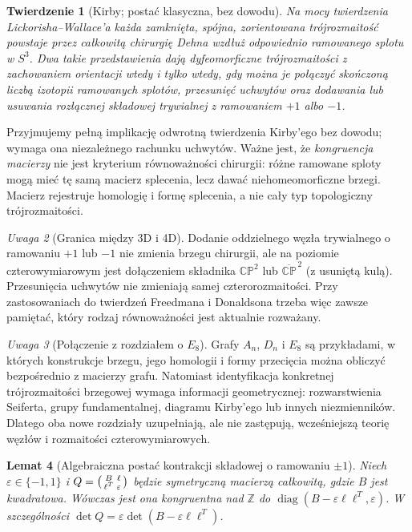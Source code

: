 \documentclass[11pt,a4paper]{report}
\numberwithin{equation}{section}
\theoremstyle{plain}
\newtheorem{twierdzenie}{Twierdzenie}[section]
\newtheorem{lemat}[twierdzenie]{Lemat}
\theoremstyle{definition}
\theoremstyle{remark}
\newtheorem{uwaga}[twierdzenie]{Uwaga}
\begin{document}
\begin{twierdzenie}[Kirby; postać klasyczna, bez dowodu]
Na mocy twierdzenia Lickorisha--Wallace'a każda zamknięta,
spójna, zorientowana trójrozmaitość powstaje przez
całkowitą chirurgię Dehna wzdłuż odpowiednio
ramowanego splotu w $S^3$.
Dwa takie przedstawienia dają dyfeomorficzne
trójrozmaitości z zachowaniem orientacji wtedy i tylko wtedy,
gdy można je połączyć skończoną liczbą izotopii
ramowanych splotów, przesunięć uchwytów oraz
dodawania lub usuwania \emph{rozłącznej} składowej
trywialnej z ramowaniem $+1$ albo $-1$.
\end{twierdzenie}

Przyjmujemy pełną implikację odwrotną twierdzenia
Kirby'ego bez dowodu; wymaga ona niezależnego
rachunku uchwytów. Ważne jest, że \emph{kongruencja
macierzy} nie jest kryterium równoważności chirurgii:
różne ramowane sploty mogą mieć tę samą macierz
splecenia, lecz dawać niehomeomorficzne brzegi.
Macierz rejestruje homologię i formę splecenia,
a nie cały typ topologiczny trójrozmaitości.

\begin{uwaga}[Granica między 3D i 4D]
Dodanie oddzielnego węzła trywialnego o ramowaniu
$+1$ lub $-1$ nie zmienia brzegu chirurgii,
ale na poziomie czterowymiarowym jest dołączeniem
składnika $\mathbb{CP}^2$ lub
$\overline{\mathbb{CP}}^{\,2}$ (z usuniętą kulą).
Przesunięcia uchwytów nie zmieniają samej
czterorozmaitości. Przy zastosowaniach do twierdzeń
Freedmana i Donaldsona trzeba więc zawsze pamiętać,
który rodzaj równoważności jest aktualnie rozważany.
\end{uwaga}

\begin{uwaga}[Połączenie z rozdziałem o $E_8$]
Grafy $A_n$, $D_n$ i $E_8$ są przykładami, w których
konstrukcje brzegu, jego homologii i formy przecięcia
można obliczyć bezpośrednio z macierzy grafu. Natomiast
identyfikacja konkretnej trójrozmaitości brzegowej
wymaga informacji geometrycznej: rozwarstwienia
Seiferta, grupy fundamentalnej, diagramu Kirby'ego
lub innych niezmienników. Dlatego oba nowe rozdziały
uzupełniają, ale nie zastępują, wcześniejszą teorię
węzłów i rozmaitości czterowymiarowych.
\end{uwaga}


\begin{lemat}[Algebraiczna postać kontrakcji składowej o ramowaniu $\pm1$]
\label{lem:tg-audit-schur}
Niech $\varepsilon\in\{-1,1\}$ i
$Q=\begin{psmallmatrix}B&\ell\\\ell^T&\varepsilon\end{psmallmatrix}$
będzie symetryczną macierzą całkowitą, gdzie $B$ jest
kwadratowa. Wówczas jest ona kongruentna nad
$\mathbb Z$ do
$\operatorname{diag}(B-\varepsilon\ell\ell^T,\varepsilon)$.
W szczególności
$\det Q=\varepsilon\det(B-\varepsilon\ell\ell^T)$.
\end{lemat}
\end{document}
